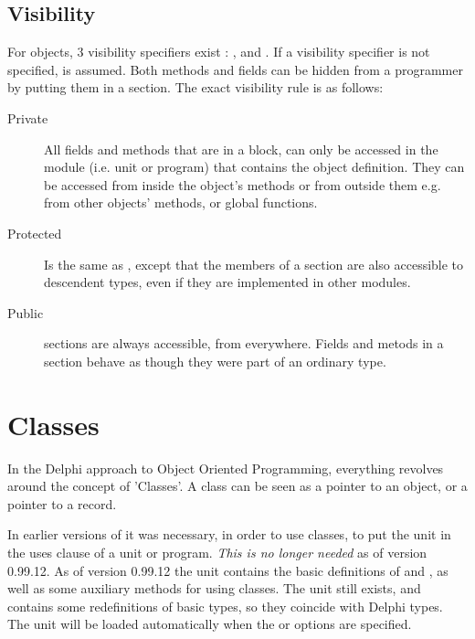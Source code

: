 \section{Visibility}
For objects, 3 visibility specifiers exist : ,  and
. If a visibility specifier is not specified, 
is assumed.
Both methods and fields can be hidden from a programmer by putting them
in a  section. The exact visibility rule is as follows:
\begin{description}
\item [Private\ ] All fields and methods that are in a  block,
can  only be accessed in the module (i.e. unit or program) that contains
the object definition.
They can be accessed from inside the object's methods or from outside them
e.g. from other objects' methods, or global functions.
\item [Protected\ ] Is the same as , except that the members of
a  section are also accessible to descendent types, even if
they are implemented in other modules.
\item [Public\ ] sections are always accessible, from everywhere.
Fields and metods in a  section behave as though they were part
of an ordinary  type.
\end{description}



\chapter{Classes}
\label{ch:Classes}
In the Delphi approach to Object Oriented Programming, everything revolves
around  the concept of 'Classes'.  A class can be seen as a pointer to an
object, or a pointer to a record.

\begin{remark}
In earlier versions of \fpc it was necessary, in order to use classes,
to put the  unit in the uses clause of a unit or program.
{\em This is no longer needed} as of version 0.99.12. As of version 0.99.12
the  unit contains the basic  definitions of 
and  , as well as some auxiliary methods for using classes.
The  unit still exists, and contains some redefinitions of
basic types, so they coincide with Delphi types. The unit will be loaded
automatically when the  or  options are specified.
\end{remark}

